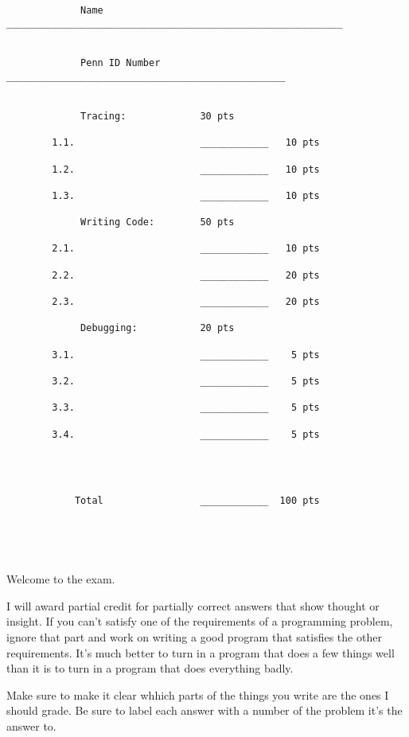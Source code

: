 \begin{verbatim}




             Name ___________________________________________________________


             Penn ID Number _________________________________________________


             Tracing:             30 pts

        1.1.                      ____________   10 pts
             
        1.2.                      ____________   10 pts
             
        1.3.                      ____________   10 pts
             
             Writing Code:        50 pts

        2.1.                      ____________   10 pts
             
        2.2.                      ____________   20 pts
             
        2.3.                      ____________   20 pts
             
             Debugging:           20 pts

        3.1.                      ____________    5 pts
             
        3.2.                      ____________    5 pts
             
        3.3.                      ____________    5 pts
             
        3.4.                      ____________    5 pts
             



            Total                 ____________  100 pts





\end{verbatim}

\newpage

Welcome to the exam. 

I will award partial credit for partially correct answers that show
thought or insight.  If you can't satisfy one of the requirements of a
programming problem, ignore that part and work on writing a good program
that satisfies the other requirements.  It's much better to turn in a
program that does a few things well than it is to turn in a program that
does everything badly.

Make sure to make it clear whhich parts of the things you write are the
ones I should grade.  Be sure to label each answer with a number of the
problem it's the answer to.

